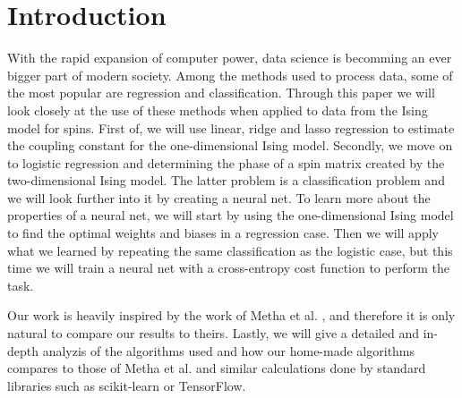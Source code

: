 \section{Introduction}
With the rapid expansion of computer power, data science is becomming an ever bigger part of modern society. Among the methods used to process data, some of the most popular are regression and classification. Through this paper we will look closely at the use of these methods when applied to data from the Ising model for spins. First of, we will use linear, ridge and lasso regression to estimate the coupling constant for the one-dimensional Ising model. Secondly, we move on to logistic regression and determining the phase of a spin matrix created by the two-dimensional Ising model. The latter problem is a classification problem and we will look further into it by creating a neural net. To learn more about the properties of a neural net, we will start by using the one-dimensional Ising model to find the optimal weights and biases in a regression case. Then we will apply what we learned by repeating the same classification as the logistic case, but this time we will train a neural net with a cross-entropy cost function to perform the task. 

Our work is heavily inspired by the work of Metha et al. \cite{2018arXiv180308823M}, and therefore it is only natural to compare our results to theirs. Lastly, we will give a detailed and in-depth analyzis of the algorithms used and how our home-made algorithms compares to those of Metha et al. and similar calculations done by standard libraries such as scikit-learn or TensorFlow.